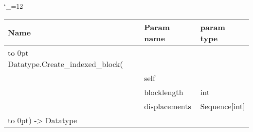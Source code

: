 \begingroup \catcode`\_=12 \tt
\begin{tabular}{lll}
\toprule
\textrm{Name}&\textrm{Param name}&\textrm{param type}\\
\midrule
\hbox to 0pt {Datatype.Create_indexed_block(\hss}\\
& self\\
& blocklength & int\\
& displacements & Sequence[int]\\
\hbox to 0pt{) -> Datatype\hss}\\
\bottomrule
\end{tabular}
\endgroup
